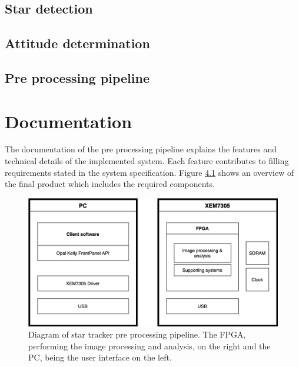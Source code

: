 \documentclass[12pt]{report}
\begin{document}
\section{Star detection}
\section{Attitude determination}
\section{Pre processing pipeline}

\chapter{Documentation}

The documentation of the pre processing pipeline explains the features and technical details of the implemented system. Each feature contributes to filling requirements stated in the system specification. Figure \ref{fig:overview} shows an overview of the final product which includes the required components.

\begin{figure}[h]
    \centering
    \includegraphics[scale=0.3]{figures/overview.png}
    \caption{Diagram of star tracker pre processing pipeline. The FPGA, performing the image processing and analysis, on the right and the PC, being the user interface on the left.}
    \label{fig:overview}
\end{figure}
\end{document}
